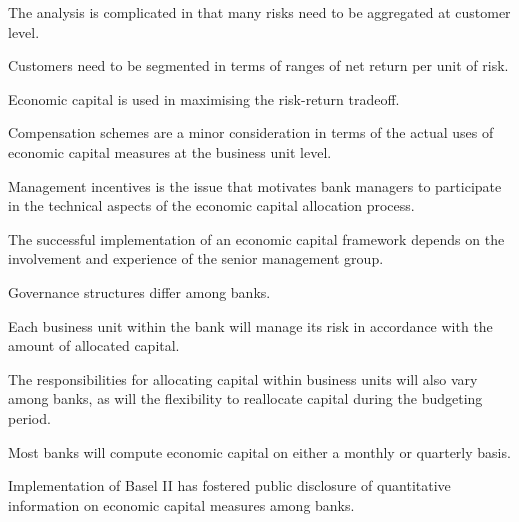\begin{checks}
\item The analysis is complicated in that many risks need to be aggregated at
customer level.
\item Customers need to be segmented in terms of ranges of net return per unit of
risk.
\item Economic capital is used in maximising the risk-return tradeoff.
\end{checks}

\begin{checks}
\item Compensation schemes are a minor consideration in terms of the actual uses of
economic capital measures at the business unit level.
\item Management incentives is the issue that motivates bank managers to
participate in the technical aspects of the economic capital allocation process.
\end{checks}



\begin{checks}
\item The successful implementation of an economic capital framework depends on the
involvement and experience of the senior management group.
\end{checks}

\begin{checks}
\item Governance structures differ among banks.
\item Each business unit within the bank will manage its risk in accordance with
the amount of allocated capital.
\item The responsibilities for allocating capital within business units will also
vary among banks, as will the flexibility to reallocate capital during the
budgeting period.
\end{checks}

\begin{checks}
\item Most banks will compute economic capital on either a monthly or quarterly
basis.
\item Implementation of Basel II has fostered public disclosure of quantitative
information on economic capital measures among banks.
\end{checks}


